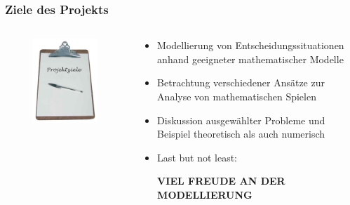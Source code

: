 \documentclass{beamer}
\begin{document}
		\begin{frame}
			\frametitle{Ziele des Projekts}
			\begin{columns}
				\begin{column}{0.48\textwidth}
					\begin{figure}
						\includegraphics[scale = 0.53]{images/projektziele.jpg}	
					\end{figure}
				\end{column}
				\begin{column}{0.5\textwidth}
					\begin{itemize}
						\item Modellierung von Entscheidungssituationen anhand geeigneter mathematischer Modelle
						\item Betrachtung verschiedener Ansätze zur Analyse von mathematischen Spielen
						\item Diskussion ausgewählter Probleme und Beispiel theoretisch als auch numerisch
						\item Last but not least:
                            \pause
                            \vspace{0.25cm}
                            \begin{center}
                                \large
                                \textbf{VIEL FREUDE AN DER MODELLIERUNG}
                            \end{center}
					\end{itemize}
				\end{column}
			\end{columns}
		\end{frame}
\end{document}
